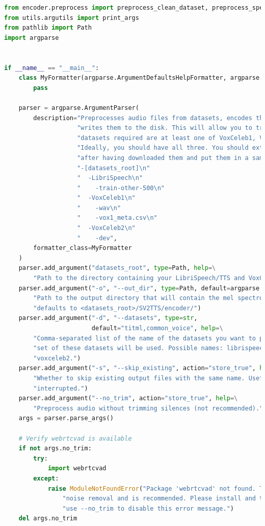 \begin{enumerate}
\begin{lstlisting}[language=Python, caption=Preprocessing Encoder Model, label=lstencoder]
from encoder.preprocess import preprocess_clean_dataset, preprocess_speech_dataset
from utils.argutils import print_args
from pathlib import Path
import argparse


if __name__ == "__main__":
    class MyFormatter(argparse.ArgumentDefaultsHelpFormatter, argparse.RawDescriptionHelpFormatter):
        pass

    parser = argparse.ArgumentParser(
        description="Preprocesses audio files from datasets, encodes them as mel spectrograms and "
                    "writes them to the disk. This will allow you to train the encoder. The "
                    "datasets required are at least one of VoxCeleb1, VoxCeleb2 and LibriSpeech. "
                    "Ideally, you should have all three. You should extract them as they are "
                    "after having downloaded them and put them in a same directory, e.g.:\n"
                    "-[datasets_root]\n"
                    "  -LibriSpeech\n"
                    "    -train-other-500\n"
                    "  -VoxCeleb1\n"
                    "    -wav\n"
                    "    -vox1_meta.csv\n"
                    "  -VoxCeleb2\n"
                    "    -dev",
        formatter_class=MyFormatter
    )
    parser.add_argument("datasets_root", type=Path, help=\
        "Path to the directory containing your LibriSpeech/TTS and VoxCeleb datasets.")
    parser.add_argument("-o", "--out_dir", type=Path, default=argparse.SUPPRESS, help=\
        "Path to the output directory that will contain the mel spectrograms. If left out, "
        "defaults to <datasets_root>/SV2TTS/encoder/")
    parser.add_argument("-d", "--datasets", type=str,
                        default="titml,common_voice", help=\
        "Comma-separated list of the name of the datasets you want to preprocess. Only the train "
        "set of these datasets will be used. Possible names: librispeech_other, voxceleb1, "
        "voxceleb2.")
    parser.add_argument("-s", "--skip_existing", action="store_true", help=\
        "Whether to skip existing output files with the same name. Useful if this script was "
        "interrupted.")
    parser.add_argument("--no_trim", action="store_true", help=\
        "Preprocess audio without trimming silences (not recommended).")
    args = parser.parse_args()

    # Verify webrtcvad is available
    if not args.no_trim:
        try:
            import webrtcvad
        except:
            raise ModuleNotFoundError("Package 'webrtcvad' not found. This package enables "
                "noise removal and is recommended. Please install and try again. If installation fails, "
                "use --no_trim to disable this error message.")
    del args.no_trim


\end{lstlisting}
\end{enumerate}
